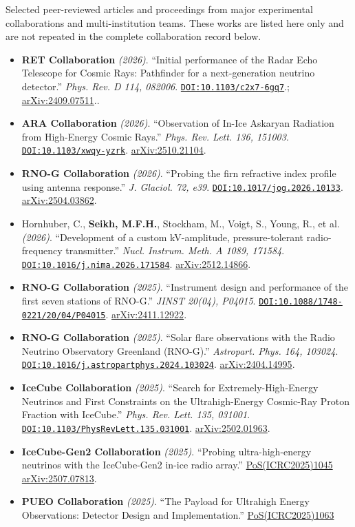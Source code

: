 \documentclass[10pt]{article}
\newcommand{\doi}[1]{{\urlstyle{tt}\href{https://doi.org/#1}{\nolinkurl{DOI:#1}}}.}
\newcommand{\arxiv}[1]{\href{https://arxiv.org/abs/#1}{arXiv:#1}.}
\begin{document}
Selected peer-reviewed articles and proceedings from major experimental collaborations and multi-institution teams. These works are listed here only and are not repeated in the complete collaboration record below.
\begin{itemize}
    \item \textbf{RET Collaboration} \textit{(2026)}. ``Initial performance of the Radar Echo Telescope for Cosmic Rays: Pathfinder for a next-generation neutrino detector.'' \textit{Phys. Rev. D 114, 082006}. \doi{10.1103/c2x7-6gq7}; \arxiv{2409.07511}.
    \item \textbf{ARA Collaboration} \textit{(2026)}. ``Observation of In-Ice Askaryan Radiation from High-Energy Cosmic Rays.'' \textit{Phys. Rev. Lett. 136, 151003}. \doi{10.1103/xwqy-yzrk} \arxiv{2510.21104}
    \item \textbf{RNO-G Collaboration} \textit{(2026)}. ``Probing the firn refractive index profile using antenna response.'' \textit{J. Glaciol. 72, e39}. \doi{10.1017/jog.2026.10133} \arxiv{2504.03862}
    \item Hornhuber, C., \textbf{Seikh, M.F.H.}, Stockham, M., Voigt, S., Young, R., et al. \textit{(2026)}. ``Development of a custom kV-amplitude, pressure-tolerant radio-frequency transmitter.'' \textit{Nucl. Instrum. Meth. A 1089, 171584}. \doi{10.1016/j.nima.2026.171584} \arxiv{2512.14866}
    \item \textbf{RNO-G Collaboration} \textit{(2025)}. ``Instrument design and performance of the first seven stations of RNO-G.'' \textit{JINST 20(04), P04015}. \doi{10.1088/1748-0221/20/04/P04015} \arxiv{2411.12922}
    \item \textbf{RNO-G Collaboration} \textit{(2025)}. ``Solar flare observations with the Radio Neutrino Observatory Greenland (RNO-G).'' \textit{Astropart. Phys. 164, 103024}. \doi{10.1016/j.astropartphys.2024.103024} \arxiv{2404.14995}
    \item \textbf{IceCube Collaboration} \textit{(2025)}. ``Search for Extremely-High-Energy Neutrinos and First Constraints on the Ultrahigh-Energy Cosmic-Ray Proton Fraction with IceCube.'' \textit{Phys. Rev. Lett. 135, 031001}. \doi{10.1103/PhysRevLett.135.031001} \arxiv{2502.01963}
    \item \textbf{IceCube-Gen2 Collaboration} \textit{(2025)}. ``Probing ultra-high-energy neutrinos with the IceCube-Gen2 in-ice radio array.'' \href{https://doi.org/10.22323/1.501.1045}{PoS(ICRC2025)1045} \arxiv{2507.07813}
    \item \textbf{PUEO Collaboration} \textit{(2025)}. ``The Payload for Ultrahigh Energy Observations: Detector Design and Implementation.'' \href{https://doi.org/10.22323/1.501.1063}{PoS(ICRC2025)1063}

\end{itemize}
\end{document}
